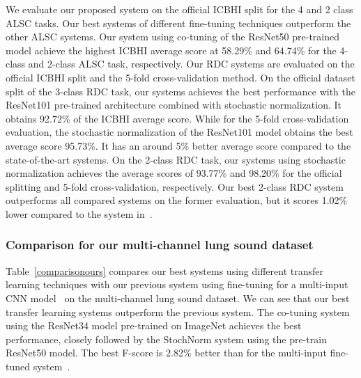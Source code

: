 \documentclass[journal]{IEEEtran}
\begin{document}
We evaluate our proposed system on the official ICBHI split for the  4 and 2 class ALSC tasks. Our best systems of different fine-tuning techniques outperform the other ALSC systems. Our system using co-tuning of the ResNet50 pre-trained model achieve the highest ICBHI average score at 58.29\% and 64.74\% for the 4-class and 2-class ALSC task, respectively. Our RDC systems are evaluated on the official ICBHI split and the 5-fold cross-validation method. On the official dataset split of the 3-class RDC task, our systems achieves the best performance with the ResNet101 pre-trained architecture combined with stochastic normalization. It obtains 92.72\% of the ICBHI average score. While for the 5-fold cross-validation evaluation, the stochastic normalization of the ResNet101 model obtains the best average score 95.73\%. It has an around 5\% better average score compared to the state-of-the-art systems. On the 2-class RDC task, our systems using stochastic normalization achieves the average scores of 93.77\% and 98.20\% for the official splitting and 5-fold cross-validation, respectively. Our best 2-class RDC system outperforms all compared systems on the former evaluation, but it scores 1.02\% lower compared to the system in~\cite{mukherjee2021automatic}.

\subsubsection{Comparison for our multi-channel lung sound dataset}
Table~\ref{comparisonours} compares our best systems using different transfer learning techniques with our previous system using fine-tuning for a multi-input CNN model~\cite{nguyen2021crackle} on the multi-channel lung sound dataset. We can see that our best transfer learning systems outperform the previous system. The co-tuning system using the ResNet34 model pre-trained on ImageNet achieves the best performance, closely followed by the StochNorm system using the pre-train ResNet50 model. The best F-score is 2.82\% better than for the multi-input fine-tuned system~\cite{nguyen2021crackle}. 
\end{document}
